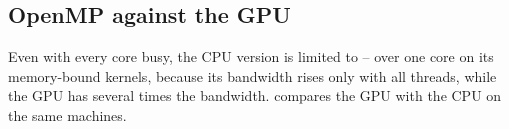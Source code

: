 \subsection{OpenMP against the GPU}
Even with every core busy, the CPU version is limited to --\x{} over one core on its memory-bound kernels,
because its bandwidth rises only \x{} with all threads, while the GPU has several times the bandwidth.
 compares the GPU with the CPU on the same machines.
